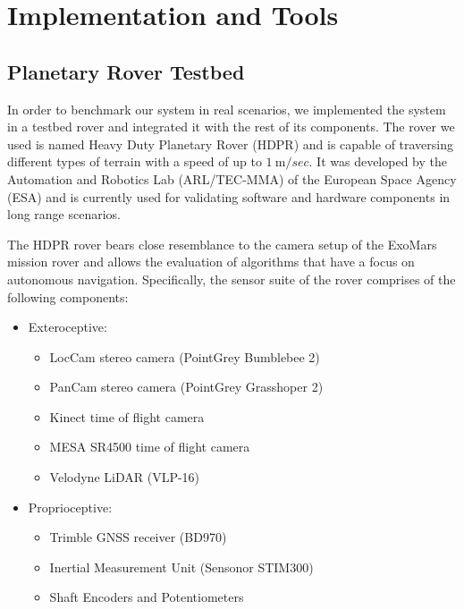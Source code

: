 \label{Chapter3}

\chapter{Implementation and Tools}

\section{Planetary Rover Testbed} \label{hdpr_rover}

In order to benchmark our system in real scenarios, we implemented the
system in a testbed rover and integrated it with the rest of its components.
The rover we used is named Heavy Duty Planetary Rover (HDPR) and is
capable of traversing different types of terrain with a speed of up to
$\SI{1}{\m \per sec}$.
It was developed by the Automation and Robotics Lab (ARL/TEC-MMA) of the
European Space Agency (ESA) and is currently used for validating
software and hardware components in long range scenarios.

The HDPR rover bears close resemblance to the camera setup of the ExoMars
mission rover and allows the evaluation of algorithms that have a focus
on autonomous navigation.
Specifically, the sensor suite of the rover comprises of the following
components:

\begin{itemize}
    \item Exteroceptive:
        \begin{itemize}
            \item LocCam stereo camera (PointGrey Bumblebee 2)
            \item PanCam stereo camera (PointGrey Grasshoper 2)
            \item Kinect time of flight camera
            \item MESA SR4500 time of flight camera
            \item Velodyne LiDAR (VLP-16)
        \end{itemize}
    \item Proprioceptive:
        \begin{itemize}
            \item Trimble GNSS receiver (BD970)
            \item Inertial Measurement Unit (Sensonor STIM300)
            \item Shaft Encoders and Potentiometers
        \end{itemize}
\end{itemize}

